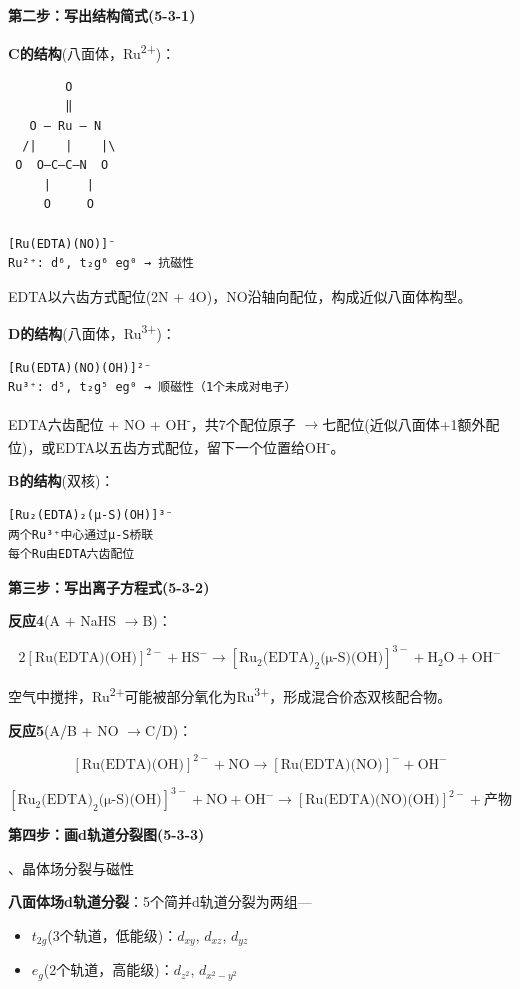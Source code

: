 \documentclass[a4paper,11pt]{ctexart}
\providecommand{\tightlist}{\setlength{\itemsep}{0pt}\setlength{\parskip}{0pt}}
\newcommand{\箭}{\ensuremath{\rightarrow}}
\newcommand{\左箭}{\ensuremath{\leftarrow}}
\newcommand{\上箭}{\ensuremath{\uparrow}}
\newcommand{\下箭}{\ensuremath{\downarrow}}
\newcommand{\衡}{\ensuremath{\rightleftharpoons}}
\newcommand{\双箭}{\ensuremath{\leftrightarrow}}
\newcommand{\约等于}{\ensuremath{\approx}}
\newcommand{\小于等于}{\ensuremath{\leq}}
\newcommand{\大于等于}{\ensuremath{\geq}}
\newcommand{\不等于}{\ensuremath{\neq}}
\newcommand{\西格马}{\ensuremath{\sigma}}
\newcommand{\派}{\ensuremath{\pi}}
\begin{document}
\textbf{第二步：写出结构简式(5-3-1)}

\textbf{C的结构}(八面体，Ru\textsuperscript{2+})：

\begin{verbatim}
        O
        ‖
   O — Ru — N
  /|    |    |\
 O  O—C—C—N  O
     |     |
     O     O
     
[Ru(EDTA)(NO)]⁻
Ru²⁺: d⁶, t₂g⁶ eg⁰ → 抗磁性
\end{verbatim}

EDTA以六齿方式配位(2N + 4O)，NO沿轴向配位，构成近似八面体构型。

\textbf{D的结构}(八面体，Ru\textsuperscript{3+})：

\begin{verbatim}
[Ru(EDTA)(NO)(OH)]²⁻
Ru³⁺: d⁵, t₂g⁵ eg⁰ → 顺磁性（1个未成对电子）
\end{verbatim}

EDTA六齿配位 + NO + OH\textsuperscript{-}，共7个配位原子 \箭 七配位(近似八面体+1额外配位)，或EDTA以五齿方式配位，留下一个位置给OH\textsuperscript{-}。

\textbf{B的结构}(双核)：

\begin{verbatim}
[Ru₂(EDTA)₂(μ-S)(OH)]³⁻
两个Ru³⁺中心通过μ-S桥联
每个Ru由EDTA六齿配位
\end{verbatim}

\textbf{第三步：写出离子方程式(5-3-2)}

\textbf{反应4}(A + NaHS \箭 B)：

\[2[\text{Ru(EDTA)(OH)}]^{2-} + \text{HS}^{-} \rightarrow [\text{Ru}_2\text{(EDTA)}_2\text{(μ-S)(OH)}]^{3-} + \text{H}_2\text{O} + \text{OH}^{-}\]

空气中搅拌，Ru\textsuperscript{2+}可能被部分氧化为Ru\textsuperscript{3+}，形成混合价态双核配合物。

\textbf{反应5}(A/B + NO \箭 C/D)：

\[[\text{Ru(EDTA)(OH)}]^{2-} + \text{NO} \rightarrow [\text{Ru(EDTA)(NO)}]^{-} + \text{OH}^{-}\]

\[[\text{Ru}_2\text{(EDTA)}_2\text{(μ-S)(OH)}]^{3-} + \text{NO} + \text{OH}^{-} \rightarrow [\text{Ru(EDTA)(NO)(OH)}]^{2-} + \text{产物}\]

\textbf{第四步：画d轨道分裂图(5-3-3)}

、晶体场分裂与磁性

\textbf{八面体场d轨道分裂}：5个简并d轨道分裂为两组---

\begin{itemize}
\tightlist
\item
  \textbf{\(t_{2g}\)}(3个轨道，低能级)：\(d_{xy}\), \(d_{xz}\), \(d_{yz}\)
\item
  \textbf{\(e_{g}\)}(2个轨道，高能级)：\(d_{z^2}\), \(d_{x^2-y^2}\)
\end{itemize}
\end{document}
